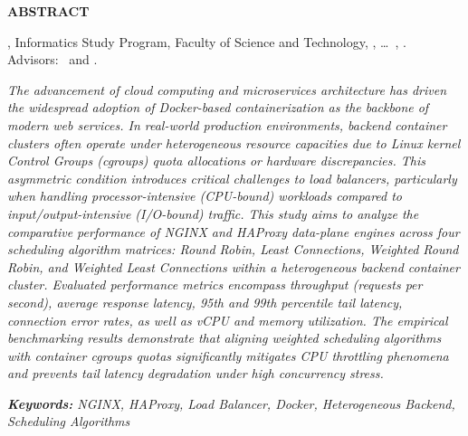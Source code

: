 
\clearpage
{}
\pagestyle{frontstyle}

\begin{center}
    {\fontsize{14pt}{18pt}\selectfont \bfseries ABSTRACT}
\end{center}

\vspace{0.8cm}

\noindent
\skripsiPenulis, Informatics Study Program, Faculty of Science and Technology, \skripsiUniversitas, \dots\ \skripsiTahun, \textit{\skripsiJudulEn}.\\
Advisors: \skripsiPembimbingSatu\ and \skripsiPembimbingDua.

\vspace{0.6cm}

\begin{singlespace}
\textit{The advancement of cloud computing and microservices architecture has driven the widespread adoption of Docker-based containerization as the backbone of modern web services. In real-world production environments, backend container clusters often operate under heterogeneous resource capacities due to Linux kernel Control Groups (cgroups) quota allocations or hardware discrepancies. This asymmetric condition introduces critical challenges to load balancers, particularly when handling processor-intensive (CPU-bound) workloads compared to input/output-intensive (I/O-bound) traffic. This study aims to analyze the comparative performance of NGINX and HAProxy data-plane engines across four scheduling algorithm matrices: Round Robin, Least Connections, Weighted Round Robin, and Weighted Least Connections within a heterogeneous backend container cluster. Evaluated performance metrics encompass throughput (requests per second), average response latency, 95th and 99th percentile tail latency, connection error rates, as well as vCPU and memory utilization. The empirical benchmarking results demonstrate that aligning weighted scheduling algorithms with container cgroups quotas significantly mitigates CPU throttling phenomena and prevents tail latency degradation under high concurrency stress.}
\end{singlespace}

\vspace{0.8cm}

\noindent
\textit{\textbf{Keywords:} NGINX, HAProxy, Load Balancer, Docker, Heterogeneous Backend, Scheduling Algorithms}
